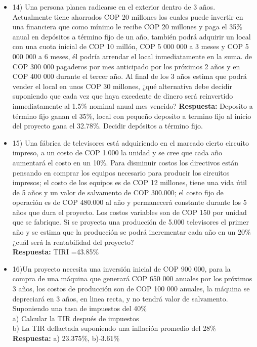 \begin{itemize}
 \item 14) Una persona planea radicarse en el exterior dentro de 3 años. Actualmente tiene ahorrados COP 20 millones los cuales puede invertir en una financiera que como mínimo le recibe COP 20 millones y paga el 35\% anual en depósitos a término fijo de un año, también podrá adquirir un local con una cuota inicial de COP 10 millón, COP 5 000 000 a 3 meses y COP 5 000 000 a 6 meses, él podría arrendar el local inmediatamente en la suma. de COP 300 000 pagaderos por mes anticipado por los próximos 2 años y en COP 400 000 durante el tercer año. Al final de los 3 años estima que podrá vender el local en unos COP 30 millones, ¿qué alternativa debe decidir suponiendo que cada vez que haya excedente de dinero será reinvertido inmediatamente al 1.5\% nominal anual mes vencido?
       \textbf{ Respuesta:} Deposito a término fijo ganan el 35\%, local con pequeño deposito a termino fijo al inicio del proyecto gana el 32.78\%. Decidir depósitos a término fijo.


 \item 15)	Una fábrica de televisores está adquiriendo en el marcado cierto circuito impreso, a un costo de COP 1.000 la unidad y se cree que cada año aumentará el costo en un 10\%. Para disminuir costos los directivos están pensando en comprar los equipos necesario para producir los circuitos impresos; el costo de los equipos es de COP 12 millones, tiene una vida útil de 5 años y un valor de salvamento de COP 300.000; el costo fijo de operación es de COP 480.000 al año y permanecerá constante durante los 5 años que dura el proyecto. Los costos variables son de COP 150 por unidad que se fabrique. Si se proyecta una producción de 5.000 televisores el primer año y se estima que la producción se podrá incrementar cada año en un 20\%¿cuál será la rentabilidad del proyecto?\\
       \textbf{Respuesta:} TIRI =43.85\%
       \medskip

 \item 16)Un proyecto necesita una inversión inicial de COP 900 000, para la compra de una máquina que generará COP 650 000 anuales por los próximos 3 años, los costos de producción son de COP 100 000 anuales, la máquina se depreciará en 3 años, en linea recta, y no tendrá valor de salvamento. Suponiendo una tasa de impuestos del 40\%\\
       a) Calcular la TIR después de impuestos\\
       b) La TIR deflactada suponiendo una inflación promedio del 28\%\\
       \textbf{ Respuesta:} a) 23.375\%, b)-3.61\%
       \medskip


\end{itemize}
